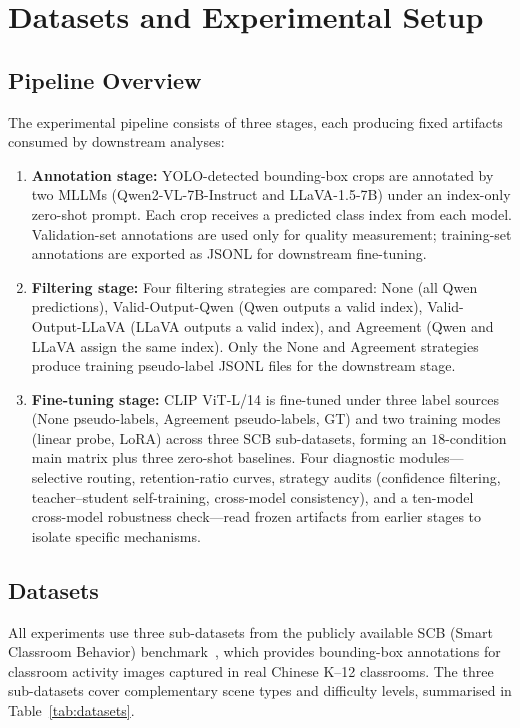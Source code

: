 \documentclass{ieeeaccess}
\begin{document}
\section{Datasets and Experimental Setup}
\label{sec:method}

\subsection{Pipeline Overview}

The experimental pipeline consists of three stages, each producing
fixed artifacts consumed by downstream analyses:
\begin{enumerate}
  \item \textbf{Annotation stage:} YOLO-detected bounding-box crops are
  annotated by two MLLMs (Qwen2-VL-7B-Instruct and LLaVA-1.5-7B) under an
  index-only zero-shot prompt. Each crop receives a predicted class index
  from each model. Validation-set annotations are used only for quality
  measurement; training-set annotations are exported as JSONL for
  downstream fine-tuning.
  \item \textbf{Filtering stage:} Four filtering strategies are compared:
  None (all Qwen predictions), Valid-Output-Qwen (Qwen outputs a valid
  index), Valid-Output-LLaVA (LLaVA outputs a valid index), and Agreement
  (Qwen and LLaVA assign the same index). Only the None and Agreement
  strategies produce training pseudo-label JSONL files for the downstream
  stage.
  \item \textbf{Fine-tuning stage:} CLIP ViT-L/14 is fine-tuned under
  three label sources (None pseudo-labels, Agreement pseudo-labels, GT)
  and two training modes (linear probe, LoRA) across three SCB
  sub-datasets, forming an $18$-condition main matrix plus three
  zero-shot baselines. Four diagnostic modules---selective routing,
  retention-ratio curves, strategy audits (confidence filtering,
  teacher--student self-training, cross-model consistency), and a
  ten-model cross-model robustness check---read frozen artifacts from
  earlier stages to isolate specific mechanisms.
\end{enumerate}

\subsection{Datasets}
\label{sec:datasets}

All experiments use three sub-datasets from the publicly available
SCB (Smart Classroom Behavior) benchmark~\cite{scb_dataset}, which
provides bounding-box annotations for classroom activity images
captured in real Chinese K--12 classrooms.
The three sub-datasets cover complementary scene types and difficulty
levels, summarised in Table~\ref{tab:datasets}.
\end{document}
